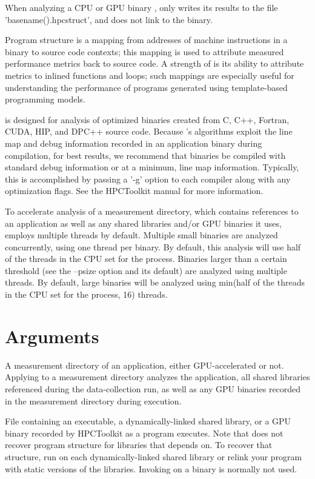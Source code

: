 \documentclass[english]{article}
\begin{document}
When analyzing a CPU or GPU binary ,  only writes its results to the file
'basename().hpcstruct', and does not link to the binary.

Program structure is a mapping from addresses of machine instructions
in a binary to source code contexts; this mapping is used to attribute
measured performance metrics back to source code. A strength of
 is its ability to attribute metrics to inlined functions
and loops; such mappings are especially useful for understanding the
performance of programs generated using template-based programming
models.

 is designed for analysis of optimized binaries created from
C, C++, Fortran, CUDA, HIP, and DPC++ source code. Because 's
algorithms exploit the line map and debug information recorded in an
application binary during compilation, for best results, we recommend that
binaries be compiled with standard debug information or at a minimum,
line map information. Typically, this is accomplished by passing a '-g'
option to each compiler along with any optimization flags. See the
HPCToolkit manual for more information.

To accelerate analysis of a measurement directory, which contains
references to an application as well as any shared libraries
and/or GPU binaries it uses,  employs multiple threads by
default. Multiple small binaries are analyzed concurrently, using one
thread per binary. By default, this analysis will use half of the
threads in the CPU set for the process. Binaries larger than a certain
threshold (see the --psize option and its default) are analyzed using
multiple threads. By default, large binaries will be analyzed using
min(half of the threads in the CPU set for the process, 16) threads.

\section{Arguments}

\begin{Description}
\item[\Arg{measurement directory}]
A measurement directory of an application, either GPU-accelerated or not.
Applying  to a measurement directory analyzes the application, all shared libraries referenced
during the data-collection run, as well as any GPU binaries recorded 
in the measurement directory during execution. 

\item[\Arg{binary}] File containing an executable, a dynamically-linked shared library, or a GPU binary
recorded by HPCToolkit as a program executes.
Note that  does not recover program structure for libraries that  depends on.
To recover that structure, run  on each dynamically-linked shared library
or relink your program with static versions of the libraries.  Invoking  on a binary
is normally not used.

\end{Description}
\end{document}
